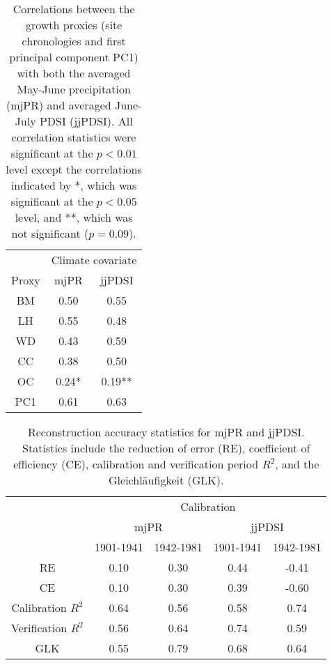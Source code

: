 \begin{table}
\begin{center}
\begin{tabular}{ccc} \toprule
 & \multicolumn{2}{c}{Climate covariate} \\
Proxy & mjPR & jjPDSI \\ \midrule
BM    & 0.50  & 0.55  \\
LH    & 0.55  & 0.48  \\
WD    & 0.43  & 0.59  \\   
CC    & 0.38  & 0.50  \\
OC    & 0.24* & 0.19** \\
PC1   & 0.61  & 0.63 \\ \bottomrule
\end{tabular}
\caption{Correlations between the growth proxies (site chronologies and first principal component PC1) with both the averaged May-June precipitation (mjPR) and averaged June-July PDSI (jjPDSI). All correlation statistics were significant at the $p<0.01$ level except the correlations indicated by *, which was significant at the $p<0.05$ level, and **, which was not significant ($p=0.09$).}
\end{center}
\label{table:moistureCorrs}
\vspace{2cm}
\end{table}

\begin{table}
\begin{center}
\begin{tabular}{ccccc}
\toprule
 & \multicolumn{4}{c}{Calibration} \\ \cmidrule(lr){2-5}
 & \multicolumn{2}{c}{mjPR} & \multicolumn{2}{c}{jjPDSI} \\ \cmidrule(lr){2-3} \cmidrule(lr){4-5} 
 & 1901-1941 & 1942-1981 & 1901-1941 & 1942-1981\\ \midrule
RE                 & 0.10 & 0.30 & 0.44 & -0.41 \\
CE                 & 0.10 & 0.30 & 0.39 & -0.60\\
Calibration $R^2$  & 0.64 & 0.56 & 0.58 & 0.74\\
Verification $R^2$ & 0.56 & 0.64 & 0.74 & 0.59 \\
GLK                & 0.55 & 0.79 & 0.68 & 0.64\\ \bottomrule
\end{tabular}
\end{center}
\caption{Reconstruction accuracy statistics for mjPR and jjPDSI. Statistics include the reduction of error (RE), coefficient of efficiency (CE), calibration and verification period $R^2$, and the Gleichl\"{a}ufigkeit (GLK).}
\label{table:reconStats}
\vspace{2cm}
\end{table}

